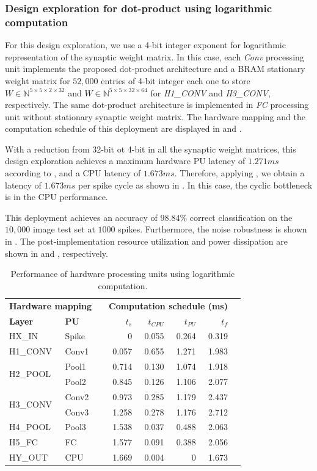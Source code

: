 \subsubsection{Design exploration for dot-product using logarithmic computation}
For this design exploration, we use a 4-bit integer exponent for logarithmic representation of the synaptic weight matrix. In this case, each \emph{Conv} processing unit implements the proposed dot-product architecture and a BRAM stationary weight matrix for $52,000$ entries of 4-bit integer each one to store $W\in\mathbb{N}^{5\times 5\times 2\times 32}$ and $W\in\mathbb{N}^{5\times 5\times 32\times 64}$ for \emph{H1\_CONV} and \emph{H3\_CONV}, respectively. The same dot-product architecture is implemented in \emph{FC} processing unit without stationary synaptic weight matrix. The hardware mapping and the computation schedule of this deployment are displayed in  and .

With a reduction from 32-bit ot 4-bit in all the synaptic weight matrices, this design exploration achieves a maximum hardware PU latency of $1.271 ms$ according to , and a CPU latency of $1.673 ms$. Therefore, applying , we obtain a latency of $1.673 ms$ per spike cycle as shown in . In this case, the cyclic bottleneck is in the CPU performance.

This deployment achieves an accuracy of $98.84\%$ correct classification on the $10,000$ image test set at $1000$ spikes. Furthermore, the noise robustness is shown in . The post-implementation resource utilization and power dissipation are shown in  and , respectively.

\begin{table}[t!]\centering
	\caption{Performance of hardware processing units using logarithmic computation.}\label{tab:latency_log}
	\scriptsize
	\begin{tabular}{llrrrrrr}\toprule
		\multicolumn{2}{c}{\textbf{Hardware mapping}} & &\multicolumn{4}{c}{\textbf{Computation schedule (ms)}} \\\cmidrule{1-2}\cmidrule{4-7}
		\textbf{Layer} &\textbf{PU} & &$t_s$ &$t_{CPU}$ &$t_{PU}$ &$t_f$ \\\midrule
		HX\_IN &Spike & &0 &0.055 &0.264 &0.319 \\
		H1\_CONV &Conv1 & &0.057 &0.655 &1.271 &1.983 \\
		\multirow{2}{*}{H2\_POOL} &Pool1 & &0.714 &0.130 &1.074 &1.918 \\
		&Pool2 & &0.845 &0.126 &1.106 &2.077 \\
		\multirow{2}{*}{H3\_CONV} &Conv2 & &0.973 &0.285 &1.179 &2.437 \\
		&Conv3 & &1.258 &0.278 &1.176 &2.712 \\
		H4\_POOL &Pool3 & &1.538 &0.037 &0.488 &2.063 \\
		H5\_FC &FC & &1.577 &0.091 &0.388 &2.056 \\
		HY\_OUT &CPU & &1.669 &0.004 &0 &1.673 \\
		\bottomrule
	\end{tabular}
\end{table}

